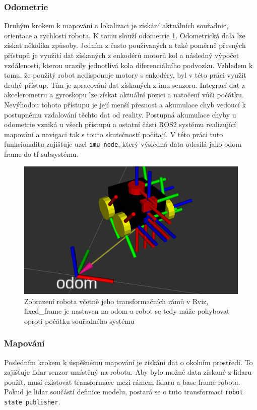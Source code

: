 \subsubsection*{Odometrie}
Druhým krokem k mapování a lokalizaci je získání aktuálních souřadnic, orientace a rychlosti robota. K tomu slouží odometrie \ref{fig:rviz_odom}. Odometrická dala lze získat několika způsoby. Jedním z často používaných a také poměrně přesných přístupů je využití dat získaných z enkodérů motorů kol a následný výpočet vzdálenosti, kterou urazily jednotlivá kola diferenciálního podvozku. Vzhledem k tomu, že použitý robot nedisponuje motory s enkodéry, byl v této práci využit druhý přístup. Tím je zpracování dat získaných z imu senzoru. Integrací dat z akcelerometru a gyroskopu lze získat aktuální pozici a natočení vůči počátku. Nevýhodou tohoto přístupu je její menší přesnost a akumulace chyb vedoucí k postupnému vzdalování těchto dat od reality. Postupná akumulace chyby u odometrie vzniká u všech přístupů a ostatní části ROS2 systému realizující mapování a navigaci tak s touto skutečností počítají. V této práci tuto funkcionalitu zajišťuje uzel \verb|imu_node|, který výsledná data odesílá jako odom frame do tf subsystému. 

\begin{figure}[h!]
	\centering
	\includegraphics[scale=0.6]{obrazky-figures/odom.png}
	\caption[Zobrazení transformací a odometrie v nástroji Rviz]{Zobrazení robota včetně jeho transformačních rámů v Rviz, fixed\_frame je nastaven na odom a robot se tedy může pohybovat oproti počátku souřadného systému}
	\label{fig:rviz_odom}
\end{figure}

\subsubsection*{Mapování}
Posledním krokem k úspěšnému mapování je získání dat o okolním prostředí. To zajišťuje lidar senzor umístěný na robotu. Aby bylo možné data získané z lidaru použít, musí existovat transformace mezi rámem lidaru a base frame robota. Pokud je lidar součástí definice modelu, postará se o tuto transformaci \verb|robot state publisher|.

